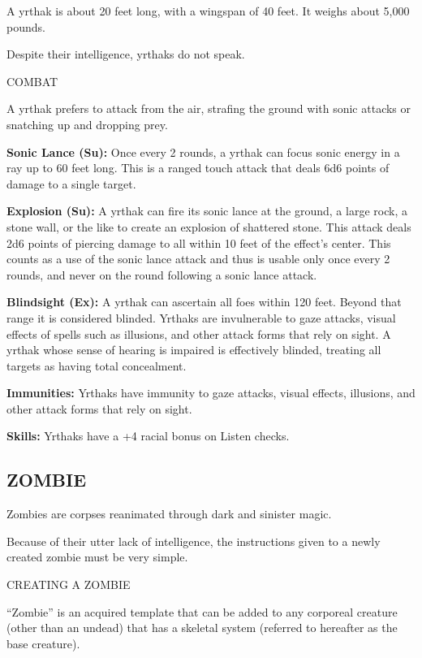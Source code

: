 \documentclass{article}
\begin{document}
A yrthak is about 20 feet long, with a wingspan of 40 feet. It weighs about 5,000 
pounds.

Despite their intelligence, yrthaks do not speak.

COMBAT

A yrthak prefers to attack from the air, strafing the ground with sonic attacks 
or snatching up and dropping prey.

\textbf{Sonic Lance (Su): }Once every 2 rounds, a yrthak can focus sonic energy 
in a ray up to 60 feet long. This is a ranged touch attack that deals 6d6 points 
of damage to a single target.

\textbf{Explosion (Su):} A yrthak can fire its sonic lance at the ground, a large 
rock, a stone wall, or the like to create an explosion of shattered stone. This 
attack deals 2d6 points of piercing damage to all within 10 feet of the effect's 
center. This counts as a use of the sonic lance attack and thus is usable only 
once every 2 rounds, and never on the round following a sonic lance attack.

\textbf{Blindsight (Ex): }A yrthak can ascertain all foes within 120 feet. Beyond 
that range it is considered blinded. Yrthaks are invulnerable to gaze attacks, 
visual effects of spells such as illusions, and other attack forms that rely on 
sight. A yrthak whose sense of hearing is impaired is effectively blinded, treating 
all targets as having total concealment.

\textbf{Immunities: }Yrthaks have immunity to gaze attacks, visual effects, illusions, 
and other attack forms that rely on sight.

\textbf{Skills:} Yrthaks have a +4 racial bonus on Listen checks.

\vspace{12pt}
\subsection*{{\LARGE{}ZOMBIE}}

Zombies are corpses reanimated through dark and sinister magic.

Because of their utter lack of intelligence, the instructions given to a newly 
created zombie must be very simple.

CREATING A ZOMBIE

``Zombie'' is an acquired template that can be added to any corporeal creature 
(other than an undead) that has a skeletal system (referred to hereafter as the 
base creature). 
\end{document}

